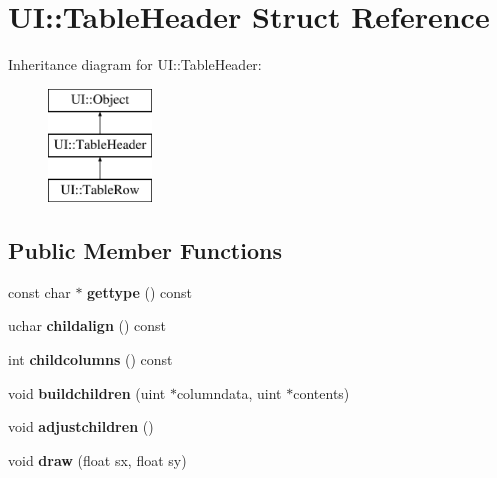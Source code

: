 \hypertarget{struct_u_i_1_1_table_header}{}\section{UI\+:\+:Table\+Header Struct Reference}
\label{struct_u_i_1_1_table_header}
Inheritance diagram for UI\+:\+:Table\+Header\+:\begin{figure}[H]
\begin{center}
\leavevmode
\includegraphics[height=3.000000cm]{struct_u_i_1_1_table_header}
\end{center}
\end{figure}
\subsection*{Public Member Functions}
\begin{DoxyCompactItemize}
\item 
\mbox{\label{struct_u_i_1_1_table_header_a951c66a6713b10d86f8a97da722b21eb}} 
const char $\ast$ {\bfseries gettype} () const
\item 
\mbox{\label{struct_u_i_1_1_table_header_afa119ee846d8db364258d95d5ad8e615}} 
uchar {\bfseries childalign} () const
\item 
\mbox{\label{struct_u_i_1_1_table_header_ae2ffe3afb53c390c00efe2d0933f88ba}} 
int {\bfseries childcolumns} () const
\item 
\mbox{\label{struct_u_i_1_1_table_header_ad9b7823d82d17092e80319eea10cbf3b}} 
void {\bfseries buildchildren} (uint $\ast$columndata, uint $\ast$contents)
\item 
\mbox{\label{struct_u_i_1_1_table_header_a44da26496a4dea85d11f5b897a49a1ae}} 
void {\bfseries adjustchildren} ()
\item 
\mbox{\label{struct_u_i_1_1_table_header_abbe33f652ee79b7d9098585162820427}} 
void {\bfseries draw} (float sx, float sy)
\end{DoxyCompactItemize}
